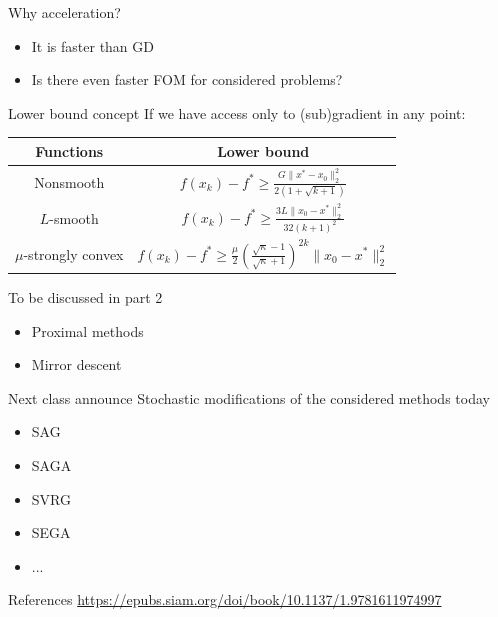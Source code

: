 \documentclass{beamer}
\begin{document}
\begin{frame}{Why acceleration?}
\begin{itemize}
\item It is faster than GD
\item Is there even faster FOM for considered problems?
\end{itemize}
\end{frame}

\begin{frame}{Lower bound concept}
If we have access only to (sub)gradient in any point:
 
\begin{table}
\centering
\begin{tabular}{|c|c|}
\hline
Functions & Lower bound\\
\hline
Nonsmooth & $f(x_k) - f^* \geq \frac{G\|x^* - x_0\|_2^2}{2(1 + \sqrt{k+1})}$\\
\hline
$L$-smooth & $f(x_k) - f^* \geq \frac{3L \|x_0 - x^*\|_2^2}{32(k+1)^2}$\\
\hline
$\mu$-strongly convex & $f(x_k) - f^* \geq \frac{\mu}{2}\left(\frac{\sqrt{\kappa} - 1}{\sqrt{\kappa} + 1} \right)^{2k} \|x_0 - x^*\|_2^2$\\
\hline
\end{tabular}
\end{table}
\end{frame}

\begin{frame}{To be discussed in part 2}
\begin{itemize}
\item Proximal methods
\item Mirror descent
\end{itemize}
\end{frame}

\begin{frame}{Next class announce}
Stochastic modifications of the considered methods today
\begin{itemize}
\item SAG
\item SAGA
\item SVRG
\item SEGA
\item ...
\end{itemize}
\end{frame}

\begin{frame}{References}
\url{https://epubs.siam.org/doi/book/10.1137/1.9781611974997 }
\end{frame}
\end{document}

